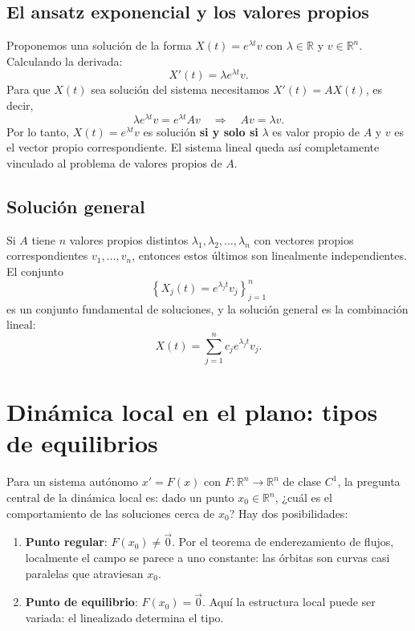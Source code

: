 \documentclass[11pt,letterpaper]{article}
\begin{document}
\subsection{El ansatz exponencial y los valores propios}

Proponemos una solución de la forma $X(t)=e^{\lambda t}v$ con
$\lambda\in\mathbb{R}$ y $v\in\mathbb{R}^n$. Calculando la derivada:
\[
X'(t)=\lambda e^{\lambda t}v.
\]
Para que $X(t)$ sea solución del sistema necesitamos $X'(t)=AX(t)$, es decir,
\[
\lambda e^{\lambda t}v = e^{\lambda t}Av \quad \Longrightarrow \quad Av=\lambda v.
\]
Por lo tanto, $X(t)=e^{\lambda t}v$ es solución \textbf{si y solo si} $\lambda$
es valor propio de $A$ y $v$ es el vector propio correspondiente. El sistema lineal
queda así completamente vinculado al problema de valores propios de $A$.

\subsection{Solución general}

Si $A$ tiene $n$ valores propios distintos $\lambda_1,\lambda_2,\ldots,\lambda_n$
con vectores propios correspondientes $v_1,\ldots,v_n$, entonces estos últimos son
linealmente independientes. El conjunto
\[
\left\{X_j(t)=e^{\lambda_j t}v_j\right\}_{j=1}^n
\]
es un conjunto fundamental de soluciones, y la solución general es la combinación lineal:
\[
X(t)=\sum_{j=1}^n c_j e^{\lambda_j t}v_j.
\]

\section{Dinámica local en el plano: tipos de equilibrios}
\label{sec:dinamica-local}

Para un sistema autónomo $x'=F(x)$ con $F:\mathbb{R}^n\to\mathbb{R}^n$ de
clase $C^1$, la pregunta central de la dinámica local es: dado un punto
$x_0\in\mathbb{R}^n$, ¿cuál es el comportamiento de las soluciones cerca de $x_0$?
Hay dos posibilidades:

\begin{enumerate}
    \item \textbf{Punto regular}: $F(x_0)\neq\vec{0}$. Por el teorema de
          enderezamiento de flujos, localmente el campo se parece a uno constante:
          las órbitas son curvas casi paralelas que atraviesan $x_0$.
    \item \textbf{Punto de equilibrio}: $F(x_0)=\vec{0}$. Aquí la estructura
          local puede ser variada: el linealizado determina el tipo.
\end{enumerate}
\end{document}
